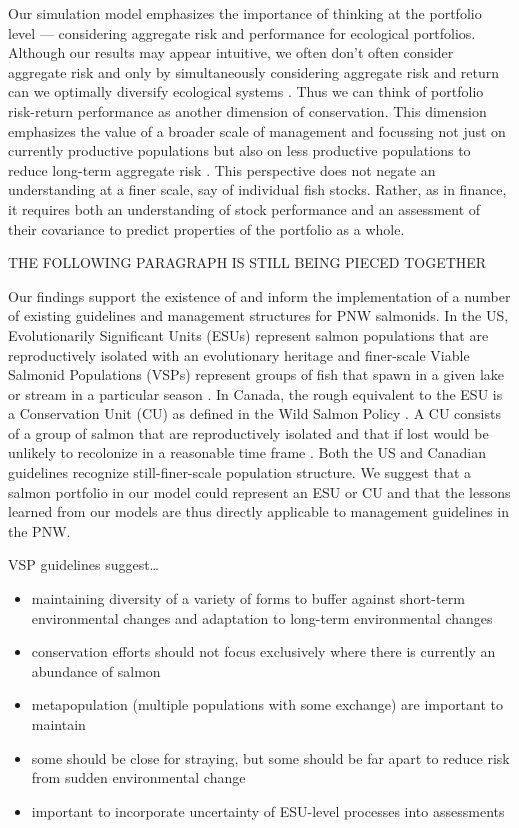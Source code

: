 Our simulation model emphasizes the importance of thinking at the portfolio level --- considering aggregate risk and performance for ecological portfolios. Although our results may appear intuitive, we often don't often consider aggregate risk and only by simultaneously considering aggregate risk and return can we optimally diversify ecological systems \citep{ando2012}. Thus we can think of portfolio risk-return performance as another dimension of conservation. This dimension emphasizes the value of a broader scale of management and focussing not just on currently productive populations but also on less productive populations to reduce long-term aggregate risk \citep[e.g.][]{hilborn2003, price2008}. This perspective does not negate an understanding at a finer scale, say of individual fish stocks. Rather, as in finance, it requires both an understanding of stock performance and an assessment of their covariance to predict properties of the portfolio as a whole.

THE FOLLOWING PARAGRAPH IS STILL BEING PIECED TOGETHER

Our findings support the existence of and inform the implementation of a number of existing guidelines and management structures for PNW salmonids. In the US, Evolutionarily Significant Units (ESUs) represent salmon populations that are reproductively isolated with an evolutionary heritage \citep{waples1991, moritz1994} and finer-scale Viable Salmonid Populations (VSPs) represent groups of fish that spawn in a given lake or stream in a particular season \citep{mceacheran2000}. In Canada, the rough equivalent to the ESU is a Conservation Unit (CU) as defined in the Wild Salmon Policy \citep{dfo2005wsp}. A CU consists of a group of salmon that are reproductively isolated and that if lost would be unlikely to recolonize in a reasonable time frame \citep{dfo2005wsp}. Both the US and Canadian guidelines recognize still-finer-scale population structure. We suggest that a salmon portfolio in our model could represent an ESU or CU and that the lessons learned from our models are thus directly applicable to management guidelines in the PNW.

VSP guidelines \citep{mceacheran2000} suggest\ldots{}

\begin{itemize}
\item
  maintaining diversity of a variety of forms to buffer against short-term environmental changes and adaptation to long-term environmental changes
\item
  conservation efforts should not focus exclusively where there is currently an abundance of salmon
\item
  metapopulation (multiple populations with some exchange) are important to maintain
\item
  some should be close for straying, but some should be far apart to reduce risk from sudden environmental change
\item
  important to incorporate uncertainty of ESU-level processes into assessments
\end{itemize}

